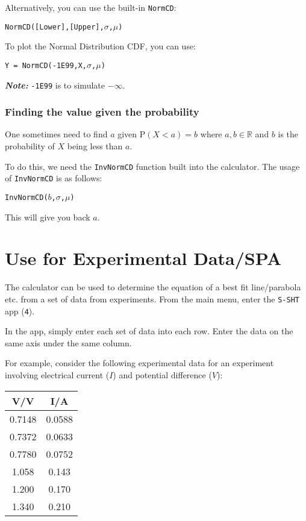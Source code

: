 \documentclass[a5paper,draft]{memoir}
\def\code#1{\texttt{#1}}
\def\note#1{\textbf{\textit{Note:}} #1}
\newcommand{\addtoindex}[1]{#1\index{#1}}
\begin{document}
Alternatively, you can use the built-in \code{\addtoindex{NormCD}}:
\begin{center}
	\code{NormCD([Lower],[Upper],$\sigma$,$\mu$)}
\end{center}

To plot the Normal Distribution CDF, you can use:
\begin{center}
	\code{Y = NormCD(-1E99,X,$\sigma$,$\mu$)}
\end{center}

\note{\code{-1E99} is to simulate $-\infty$.}

\subsubsection{Finding the value given the probability}
One sometimes need to find $a$ given $\textrm{P}(X < a) = b$ where $a,b \in \mathbb{R}$ and $b$ is the probability of $X$ being less than $a$. 

To do this, we need the \code{\addtoindex{InvNormCD}} function built into the calculator. The usage of \code{InvNormCD} is as follows:
\begin{center}
	\code{InvNormCD($b$,$\sigma$,$\mu$)}
\end{center}

This will give you back $a$.

\section{Use for Experimental Data/SPA}
The calculator can be used to determine the equation of a best fit line/parabola etc. from a set of data from experiments. From the main menu, enter the \code{S-SHT} app (\code{4}). 

In the app, simply enter each set of data into each row. Enter the data on the same axis under the same column.

For example, consider the following experimental data for an experiment involving electrical current ($I$) and potential difference ($V$): 

\begin{center}
	\setlength{\tabcolsep}{10pt}
	\renewcommand{\arraystretch}{1.2}
	\begin{tabular}{|c|c|}
		\hline
		\textbf{V/V}	& \textbf{I/A} \\
		\hline
		0.7148			& 0.0588 \\
		\hline
		0.7372			& 0.0633 \\
		\hline
		0.7780			& 0.0752 \\
		\hline
		1.058			& 0.143 \\
		\hline
		1.200			& 0.170 \\
		\hline
		1.340			& 0.210 \\
		\hline
	\end{tabular}
\end{center}
\end{document}
